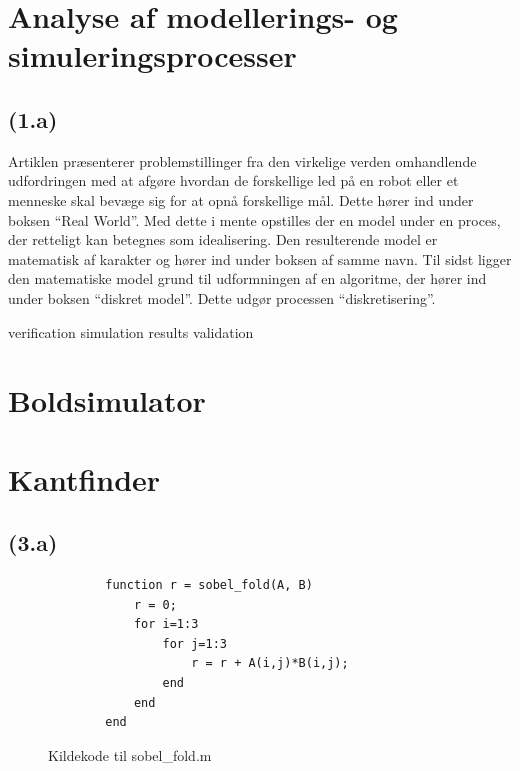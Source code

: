 \documentclass{article}
\author{Mikkel Kragh Mathiesen, Jannik Gram, Rune \& Rasmus Abrahams{\tt (son|en)}}
\title{}
\date{\today}
\begin{document}
\maketitle

\section{Analyse af modellerings- og simuleringsprocesser}
\subsection*{(1.a)}
Artiklen præsenterer problemstillinger fra den virkelige verden omhandlende udfordringen med at afgøre hvordan de forskellige led på en robot eller et menneske skal bevæge sig for at opnå forskellige mål. Dette hører ind under boksen ``Real World''. Med dette i mente opstilles der en model under en proces, der retteligt kan betegnes som idealisering. Den resulterende model er matematisk af karakter og hører ind under boksen af samme navn. Til sidst ligger den matematiske model grund til udformningen af en algoritme, der hører ind under boksen ``diskret model''. Dette udgør processen ``diskretisering''.

verification
simulation
results
validation

\section{Boldsimulator}

\section{Kantfinder}

\subsection*{(3.a)}

\begin{figure}
	\begin{verbatim}
		function r = sobel_fold(A, B)
		    r = 0;
		    for i=1:3
		        for j=1:3
		            r = r + A(i,j)*B(i,j);
		        end
		    end
		end
	\end{verbatim}
	\caption{Kildekode til sobel\_fold.m}
	\label{sobelfold}
\end{figure}
\end{document}
